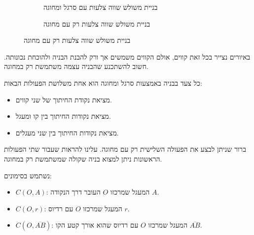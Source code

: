 \begin{figure}[htb]
\begin{center}
\begin{subfigure}{.4\textwidth}
\caption{בניית משולש שווה צלעות עם סרגל ומחוגה}\label{}
\end{subfigure}
\hspace{3em}
\begin{subfigure}{.4\textwidth}
\caption{בניית משולש שווה צלעות רק עם מחוגה}\label{}
\end{subfigure}
\end{center}
\end{figure}
באיורים נצייר בכל זאת קווים, אולם הקווים משמשים אך ורק להבנת הבניה ולהוכחת נכונותה. חשוב להשתכנע שהבניה עצמה משתמשת רק במחוגה.


כל צעד בבניה באמצעות סרגל ומחוגה הוא אחת משלושת הפעולות הבאות:
\begin{itemize}
\item
מציאת נקודת החיתוך של שני קווים.
\item
מציאת נקודות החיתוך בין קו ומעגל.
\item
מציאת נקודות החיתוך בין שני מעגלים.
\end{itemize}
ברור שניתן לבצע את הפעולה השלישית רק עם מחוגה. עלינו להראות שעבור שתי הפעולות הראשונות ניתן למצוא בניה שקולה שמשתמשת רק במחוגה.


נשתמש בסימונים:
\begin{itemize}
\item $C(O,A)$: 
המעגל שמרכזו
$O$
העובר דרך הנקודה
$A$.
\item $C(O,r)$:
המעגל שמרכזו
$O$
עם רדיוס
$r$.
\item $C(O,\overline{AB})$:
המעגל שמרכזו
$O$
עם רדיוס שהוא אורך קטע הקו
$\overline{AB}$.
\end{itemize}

